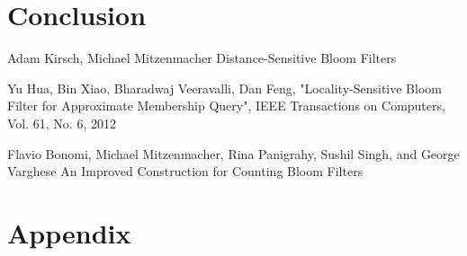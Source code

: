 \documentclass[a4paper,11pt]{article}
\begin{document}



\section{Conclusion}
\newpage

\begin{thebibliography}{}

Adam Kirsch, Michael Mitzenmacher
Distance-Sensitive Bloom Filters

Yu Hua, Bin Xiao, Bharadwaj Veeravalli, Dan Feng, "Locality-Sensitive Bloom Filter for Approximate Membership Query", IEEE Transactions on Computers, Vol. 61, No. 6, 2012


Flavio Bonomi, Michael Mitzenmacher, Rina Panigrahy, Sushil Singh, and George Varghese
An Improved Construction for Counting Bloom Filters

\end{thebibliography}

\section*{Appendix}
%
\end{document}
